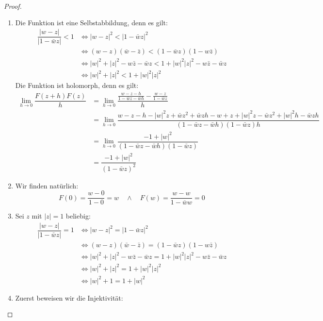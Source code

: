 \documentclass[11pt]{article}
\begin{document}
    \begin{proof}
        \begin{enumerate}[label=(\alph*)]
            \item Die Funktion ist eine Selbstabbildung, denn es gilt:
            $$\begin{aligned}
                  \dfrac{|w-z|}{|1-\bar{w}z|}<1&\Leftrightarrow |w-z|^2<|1-\bar{w}z|^2\\
                  &\Leftrightarrow (w-z)(\bar{w}-\bar{z}) < (1-\bar{w}z)(1-w\bar{z})\\
                  &\Leftrightarrow |w|^2+|z|^2-w\bar{z}-\bar{w}z < 1+|w|^2|z|^2-w\bar{z}-\bar{w}z\\
                  &\Leftrightarrow |w|^2+|z|^2 < 1+|w|^2|z|^2
            \end{aligned}$$
            Die Funktion ist holomorph, denn es gilt:
            $$\begin{aligned}
                  \lim_{h\to 0}\dfrac{F(z+h)F(z)}{h} &= \lim_{h\to 0}\dfrac{\frac{w-z-h}{1-\bar{w}z-\bar{w}h}
                  -\frac{w-z}{1-\bar{w}z}}{h} \\
                  &= \lim_{h\to 0}\dfrac{w-z-h-|w|^2z+\bar{w}z^2+\bar{w}zh-w+z+|w|^2z-\bar{w}z^2+|w|^2h-\bar{w}zh}
                  {(1-\bar{w}z-\bar{w}h)(1-\bar{w}z)h}\\
                  &= \lim_{h\to 0}\dfrac{-1+|w|^2}{(1-\bar{w}z-\bar{w}h)(1-\bar{w}z)}\\
                  &= \dfrac{-1+|w|^2}{(1-\bar{w}z)^2}
            \end{aligned}$$
            \item Wir finden natürlich:
            $$F(0) = \dfrac{w-0}{1-0}=w\quad \land\quad F(w) = \dfrac{w-w}{1-\bar{w}w}=0$$
            \item Sei $z$ mit $|z|=1$ beliebig:
            $$\begin{aligned}
                  \dfrac{|w-z|}{|1-\bar{w}z|}=1&\Leftrightarrow |w-z|^2=|1-\bar{w}z|^2\\
                  &\Leftrightarrow (w-z)(\bar{w}-\bar{z}) = (1-\bar{w}z)(1-w\bar{z})\\
                  &\Leftrightarrow |w|^2+|z|^2-w\bar{z}-\bar{w}z = 1+|w|^2|z|^2-w\bar{z}-\bar{w}z\\
                  &\Leftrightarrow |w|^2+|z|^2 = 1+|w|^2|z|^2\\
                  &\Leftrightarrow |w|^2+1=1+|w|^2
            \end{aligned}$$
            \item Zuerst beweisen wir die Injektivität:

\end{enumerate}
\end{proof}
\end{document}
